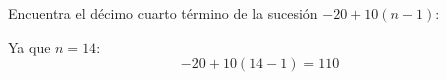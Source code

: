 Encuentra el décimo cuarto término de la sucesión $-20+10(n-1)$:

\begin{solutionbox}{1.6cm}
    Ya que $n=14$:
    \[-20+10(14-1)=110\]
\end{solutionbox}